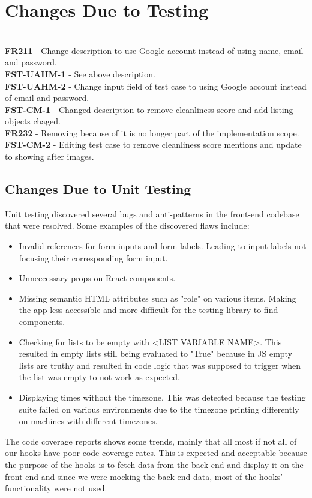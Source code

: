 \documentclass[12pt, titlepage]{article}
\begin{document}
\section{Changes Due to Testing}

\\
\textbf{FR211} - Change description to use Google account instead of using name, email and password.\\
\textbf{FST-UAHM-1} - See above description. \\
\textbf{FST-UAHM-2} - Change input field of test case to using Google account instead of email and password. \\
\textbf{FST-CM-1} - Changed description to remove cleanliness score and add listing objects chaged. \\
\textbf{FR232} - Removing because of it is no longer part of the implementation scope. \\
\textbf{FST-CM-2} - Editing test case to remove cleanliness score mentions and update to showing after images. \\


\subsection{Changes Due to Unit Testing}
Unit testing discovered several bugs and anti-patterns in the front-end codebase that were resolved. Some examples of the discovered flaws include:
\begin{itemize}
\item Invalid references for form inputs and form labels. Leading to input labels not focusing their corresponding form input.
\item Unneccessary props on React components.
\item Missing semantic HTML attributes such as "role" on various items. Making the app less accessible and more difficult for the testing library to find components.
\item Checking for lists to be empty with <LIST VARIABLE NAME>. This resulted in empty lists still being evaluated to "True" because in JS empty lists are truthy and resulted in code logic that was supposed to trigger when the list was empty to not work as expected.
\item Displaying times without the timezone. This was detected because the testing suite failed on various environments due to the timezone printing differently on machines with different timezones.
\end{itemize}
The code coverage reports shows some trends, mainly that all most if not all of our hooks have poor code coverage rates. This is expected and acceptable because the purpose of the hooks is to fetch data from the back-end and display it on the front-end and since we were mocking the back-end data, most of the hooks' functionality were not used.
\end{document}
